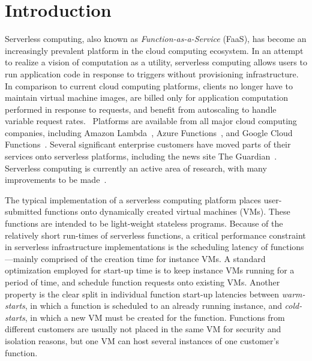 \section{Introduction} \label{sec:intro}

 Serverless computing, also known as
\emph{Function-as-a-Service} (FaaS), has become an increasingly prevalent
platform in the cloud computing ecosystem. In an attempt to realize a vision of
computation as a utility, serverless computing allows users to run application
code in response to triggers without provisioning infrastructure. In comparison
to current cloud computing platforms, clients no longer have to maintain virtual
machine images, are billed only for application computation performed in
response to requests, and benefit from autoscaling to handle variable request
rates.~\cite{berkeley-serverless} Platforms are available from all major cloud
computing companies, including Amazon Lambda~\cite{lambda}, Azure
Functions~\cite{azure-cf}, and Google Cloud Functions~\cite{gcf}. Several
significant enterprise customers have moved parts of their services onto
serverless platforms, including the news site The Guardian~\cite{guardian}.
Serverless computing is currently an active area of research, with many
improvements to be made~\cite{peeking}\cite{trilemma}\cite{steps-back}.

 The typical implementation of a
serverless computing platform places user-submitted functions onto dynamically
created virtual machines (VMs). These functions are intended to be light-weight
stateless programs. Because of the relatively short run-times of serverless
functions, a critical performance constraint in serverless infrastructure
implementations is the scheduling latency of functions---mainly comprised of
the creation time for instance VMs. A standard optimization employed for
start-up time is to keep instance VMs running for a period of time, and
schedule function requests onto existing VMs. Another property is the clear
split in individual function start-up latencies between \emph{warm-starts}, in
which a function is scheduled to an already running instance, and
\emph{cold-starts}, in which a new VM must be created for the function.
Functions from different customers are usually not placed in the same VM for
security and isolation reasons, but one VM can host several instances of one
customer's function.

